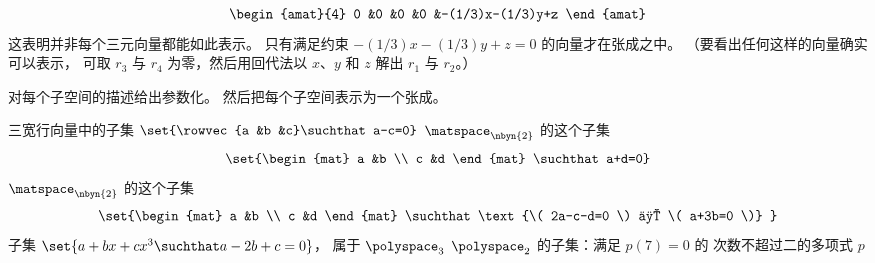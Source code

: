 \begin{exercises}
\begin{answer}
\begin{exparts}
\begin{multline*}
\begin{amat}{4}
             0  &0     &0     &0  &-(1/3)x-(1/3)y+z
           \end{amat}
         \end{multline*}
         这表明并非每个三元向量都能如此表示。
         只有满足约束 $-(1/3)x-(1/3)y+z=0$ 的向量才在张成之中。
         （要看出任何这样的向量确实可以表示，
         可取 $r_3$ 与 $r_4$
         为零，然后用回代法以 $x$、$y$ 和
         $z$ 解出 $r_1$ 与 $r_2$。）
      \end{exparts}
    \end{answer}
  \recommended \item
    对每个子空间的描述给出参数化。
    然后把每个子空间表示为一个张成。
    \begin{exparts}
      \partsitem  三宽行向量中的子集
        \( \set{\rowvec{a &b &c}\suchthat a-c=0}   \)
      \partsitem \( \matspace_{\nbyn{2}} \) 的这个子集
        \begin{equation*}
          \set{\begin{mat}
                 a  &b  \\
                 c  &d
               \end{mat}  \suchthat a+d=0}
        \end{equation*}
      \partsitem \( \matspace_{\nbyn{2}} \) 的这个子集
        \begin{equation*}
          \set{\begin{mat}
                 a  &b  \\
                 c  &d
               \end{mat}  \suchthat \text{\( 2a-c-d=0 \)
                                               且 \( a+3b=0 \)} }
        \end{equation*}
      \partsitem 子集 \( \set{a+bx+cx^3\suchthat a-2b+c=0} \)，
        属于 \( \polyspace_3 \)
      \partsitem \( \polyspace_2 \) 的子集：满足 \( p(7)=0 \) 的
        次数不超过二的多项式 \( p \)
    \end{exparts}
    \begin{answer}
\end{answer}
\end{exercises}
